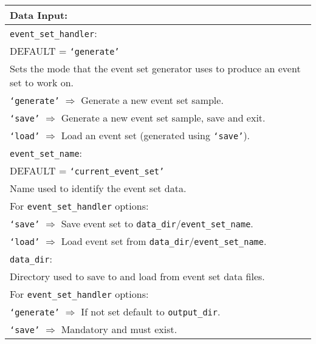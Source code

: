 \vspace{2em}
\begin{tabular}{|p{\textwidth}|}
\hline
\vspace{0.3em} \noindent \Large \textbf{Data Input:} \normalsize \\
\hline \vspace{0.1em} \texttt{event\_set\_handler}: \\
DEFAULT = \texttt{`generate'} \\
Sets the mode that the event set generator uses to produce an event set to work
on. \\
 \hspace{0.5em} \texttt{`generate'} $\Rightarrow$ Generate a new event set
 sample. \\
 \hspace{0.5em} \texttt{`save'} $\Rightarrow$ Generate a new event set sample,
 save and exit. \\
 \hspace{0.5em} \texttt{`load'} $\Rightarrow$ Load an event set (generated using
 \texttt{`save'}). \\
\hline \vspace{0.1em} \texttt{event\_set\_name}: \\
DEFAULT = \texttt{`current\_event\_set'} \\
Name used to identify the event set data. \\
For \texttt{event\_set\_handler} options: \\
 \hspace{0.5em} \texttt{`save'} $\Rightarrow$ Save event set to
 \texttt{data\_dir}/\texttt{event\_set\_name}. \\
 \hspace{0.5em} \texttt{`load'} $\Rightarrow$ Load event set from
 \texttt{data\_dir}/\texttt{event\_set\_name}. \\
\hline \vspace{0.1em} \texttt{data\_dir}: \\
Directory used to save to and load from event set data files. \\
For \texttt{event\_set\_handler} options: \\
 \hspace{0.5em} \texttt{`generate'} $\Rightarrow$ If not set default to 
 \texttt{output\_dir}. \\
 \hspace{0.5em} \texttt{`save'} $\Rightarrow$ Mandatory and must exist. \\

\end{tabular}
